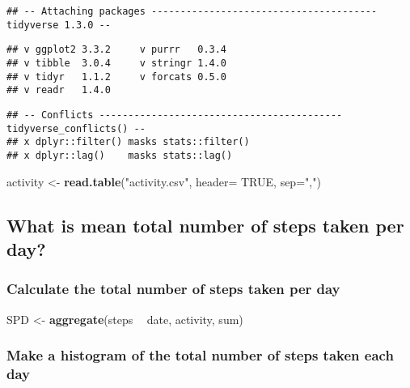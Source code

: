 \documentclass[
]{article}
\newenvironment{Shaded}{\begin{snugshade}}{\end{snugshade}}
\newcommand{\DataTypeTok}[1]{\textcolor[rgb]{0.13,0.29,0.53}{#1}}
\newcommand{\KeywordTok}[1]{\textcolor[rgb]{0.13,0.29,0.53}{\textbf{#1}}}
\newcommand{\NormalTok}[1]{#1}
\newcommand{\OperatorTok}[1]{\textcolor[rgb]{0.81,0.36,0.00}{\textbf{#1}}}
\newcommand{\OtherTok}[1]{\textcolor[rgb]{0.56,0.35,0.01}{#1}}
\newcommand{\StringTok}[1]{\textcolor[rgb]{0.31,0.60,0.02}{#1}}
\begin{document}
\begin{verbatim}
## -- Attaching packages --------------------------------------- tidyverse 1.3.0 --
\end{verbatim}

\begin{verbatim}
## v ggplot2 3.3.2     v purrr   0.3.4
## v tibble  3.0.4     v stringr 1.4.0
## v tidyr   1.1.2     v forcats 0.5.0
## v readr   1.4.0
\end{verbatim}

\begin{verbatim}
## -- Conflicts ------------------------------------------ tidyverse_conflicts() --
## x dplyr::filter() masks stats::filter()
## x dplyr::lag()    masks stats::lag()
\end{verbatim}

\begin{Shaded}
\begin{Highlighting}[]
\NormalTok{activity <-}\StringTok{ }\KeywordTok{read.table}\NormalTok{(}\StringTok{"activity.csv"}\NormalTok{, }\DataTypeTok{header=} \OtherTok{TRUE}\NormalTok{, }\DataTypeTok{sep=}\StringTok{","}\NormalTok{)}
\end{Highlighting}
\end{Shaded}

\hypertarget{what-is-mean-total-number-of-steps-taken-per-day}{%
\subsection{What is mean total number of steps taken per
day?}\label{what-is-mean-total-number-of-steps-taken-per-day}}

\hypertarget{calculate-the-total-number-of-steps-taken-per-day}{%
\subsubsection{Calculate the total number of steps taken per
day}\label{calculate-the-total-number-of-steps-taken-per-day}}

\begin{Shaded}
\begin{Highlighting}[]
\NormalTok{SPD <-}\StringTok{ }\KeywordTok{aggregate}\NormalTok{(steps }\OperatorTok{~}\StringTok{ }\NormalTok{date, activity, sum)}
\end{Highlighting}
\end{Shaded}

\hypertarget{make-a-histogram-of-the-total-number-of-steps-taken-each-day}{%
\subsubsection{Make a histogram of the total number of steps taken each
day}\label{make-a-histogram-of-the-total-number-of-steps-taken-each-day}}
\end{document}
